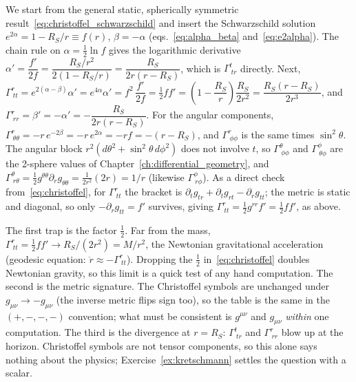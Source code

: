 \begin{derivation}
We start from the general static, spherically symmetric result~\eqref{eq:christoffel_schwarzschild}
and insert the Schwarzschild solution $e^{2\alpha} = 1 - R_S/r \equiv f(r)$, $\beta = -\alpha$
(eqs.~\eqref{eq:alpha_beta} and~\eqref{eq:e2alpha}).
The chain rule on $\alpha = \tfrac12\ln f$ gives the logarithmic derivative
$\alpha' = \dfrac{f'}{2f} = \dfrac{R_S/r^2}{2(1 - R_S/r)} = \dfrac{R_S}{2r(r - R_S)}$,
which is $\Gamma^t_{\ tr}$ directly.
Next, $\Gamma^r_{\ tt} = e^{2(\alpha-\beta)}\alpha' = e^{4\alpha}\alpha' = f^2\,\dfrac{f'}{2f}
= \tfrac12 f f' = \left(1 - \dfrac{R_S}{r}\right)\dfrac{R_S}{2r^2} = \dfrac{R_S(r - R_S)}{2r^3}$,
and $\Gamma^r_{\ rr} = \beta' = -\alpha' = -\dfrac{R_S}{2r(r - R_S)}$.
For the angular components, $\Gamma^r_{\ \theta\theta} = -r\,e^{-2\beta} = -r\,e^{2\alpha} = -r f = -(r - R_S)$,
and $\Gamma^r_{\ \phi\phi}$ is the same times $\sin^2\theta$.
The angular block $r^2(d\theta^2 + \sin^2\theta\,d\phi^2)$ does not involve $t$, so
$\Gamma^\theta_{\ \phi\phi}$ and $\Gamma^\phi_{\ \theta\phi}$ are the 2-sphere
values of Chapter~\ref{ch:differential_geometry}, and
$\Gamma^\theta_{\ r\theta} = \tfrac12 g^{\theta\theta}\partial_r g_{\theta\theta}
= \tfrac{1}{2r^2}(2r) = 1/r$ (likewise $\Gamma^\phi_{\ r\phi}$).
As a direct check from~\eqref{eq:christoffel}, for $\Gamma^r_{\ tt}$ the bracket is
$\partial_t g_{tr} + \partial_t g_{rt} - \partial_r g_{tt}$; the metric is static and diagonal,
so only $-\partial_r g_{tt} = f'$ survives, giving
$\Gamma^r_{\ tt} = \tfrac12 g^{rr} f' = \tfrac12 f f'$, as above.
\end{derivation}

\begin{annotation}
The first trap is the factor $\tfrac12$. Far from the mass, $\Gamma^r_{\ tt} = \tfrac12 f f' \to R_S/(2r^2) = M/r^2$,
the Newtonian gravitational acceleration (geodesic equation: $\ddot r \approx -\Gamma^r_{\ tt}$).
Dropping the $\tfrac12$ in~\eqref{eq:christoffel} doubles Newtonian gravity, so this limit is a
quick test of any hand computation.
The second is the metric signature. The Christoffel symbols are unchanged under $g_{\mu\nu} \to -g_{\mu\nu}$
(the inverse metric flips sign too), so the table is the same in the $(+,-,-,-)$ convention; what
must be consistent is $g^{\mu\nu}$ and $g_{\mu\nu}$ \emph{within} one computation.
The third is the divergence at $r = R_S$: $\Gamma^t_{\ tr}$ and $\Gamma^r_{\ rr}$ blow up at the horizon.
Christoffel symbols are not tensor components, so this alone says nothing about the physics;
Exercise~\ref{ex:kretschmann} settles the question with a scalar.
\end{annotation}

